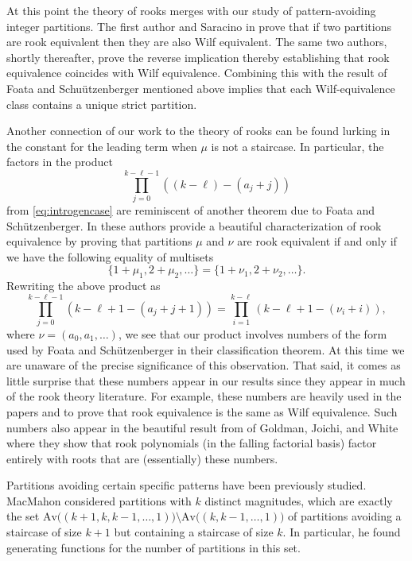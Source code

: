 \documentclass{article}
\theoremstyle{plain}
\theoremstyle{definition}
\newcommand{\Av}{\text{Av}}
\begin{document}
At this point the theory of rooks merges with our study of pattern-avoiding integer partitions.  The first author and Saracino in \cite{Bloom:Rook-2018} prove that if two partitions are rook equivalent then they are also Wilf equivalent.  The same two authors, shortly thereafter, prove \cite{Bloom:On-cr2018} the reverse implication thereby establishing that rook equivalence coincides with Wilf equivalence.  Combining this with the result of Foata and Schu\"{u}tzenberger mentioned above implies that each Wilf-equivalence class contains a unique strict partition. 

Another connection of our work to the theory of rooks can be found lurking in the constant for the leading term when $\mu$ is not a staircase.  In particular, the factors in the product  $$\prod_{j=0}^{k-\ell-1}\left((k-\ell) -(a_j+j)\right)$$ 
from \eqref{eq:introgencase} are reminiscent of another theorem due to Foata and Sch\"utzenberger.  In \cite{foata1970rook} these authors provide a beautiful characterization of rook equivalence by proving that partitions $\mu$ and $\nu$ are rook equivalent if and only if we have the following equality of multisets 
$$\{1+\mu_1, 2+\mu_2,\ldots\}=\{1+\nu_1, 2+\nu_2,\ldots\}.$$  
Rewriting the above product as 
$$\prod_{j=0}^{k-\ell-1}\left(k-\ell+1 -(a_j+j+1)\right)= \prod_{i=1}^{k-\ell}\left(k-\ell+1 -(\nu_i+i)\right),$$
where $\nu = (a_0,a_1,\ldots)$, we see that our product involves numbers of the form used by Foata and Sch\"utzenberger in their classification theorem.  At this time we are unaware of the precise significance of this observation.  That said, it comes as little surprise that these numbers appear in our results since they appear in much of the rook theory literature.  For example, these numbers are heavily used in the papers   \cite{Bloom:Rook-2018} and \cite{Bloom:On-cr2018} to prove that rook equivalence is the same as Wilf equivalence.  Such numbers also appear in the beautiful result from \cite{goldman1975rook} of Goldman, Joichi, and White where they show that rook polynomials (in the falling factorial basis) factor entirely with roots that are (essentially) these numbers.

Partitions avoiding certain specific patterns have been previously studied.  MacMahon \cite{MacMahon} considered partitions with $k$ distinct magnitudes, which are exactly the set  $\Av\big((k+1,k,k-1,\ldots,1)\big) \setminus \Av\big((k,k-1,\ldots,1)\big)$ of partitions avoiding a staircase of size $k+1$ but containing a staircase of size $k$.  In particular, he found generating functions for the number of partitions in this set.  
\end{document}

